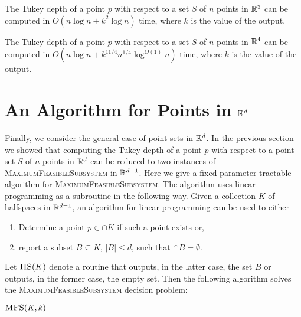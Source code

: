 \documentclass[charterfonts,lotsofwhite]{patmorin}
\begin{document}
\begin{thm}
The Tukey depth of a point $p$ with respect to a set $S$ of $n$ points
in $\mathbb{R}^3$ can be computed in $O(n\log n + k^2\log n)$ time, where
$k$ is the value of the output.
\end{thm}


\begin{thm}
The Tukey depth of a point $p$ with respect to a set $S$ of $n$ points
in $\mathbb{R}^4$ can be computed in $O(n\log n + k^{11/4}n^{1/4}\log^{O(1)}
n)$ time, where $k$ is the value of the output.
\end{thm}

\section{An Algorithm for Points in $\mathbb{R}^d$}

Finally, we consider the general case of point sets in $\mathbb{R}^d$.  
In the previous section we showed that computing the Tukey depth of
a point $p$ with respect to a point set $S$ of $n$ points in $\mathbb{R}^d$
can be reduced to two instances of \textsc{MaximumFeasibleSubsystem}
in $\mathbb{R}^{d-1}$.  Here we give a fixed-parameter tractable \cite{dfXX}
algorithm for \textsc{MaximumFeasibleSubsystem}.  The algorithm uses
linear programming as a subroutine in the following way.  Given a
collection $K$ of halfspaces in $\mathbb{R}^{d-1}$, an algorithm for linear
programming can be used to either
\begin{enumerate}
\item Determine a point $p\in\cap K$ if such a point exists or,
\item report a subset $B\subseteq K$, $|B|\le d$, such that $\cap B=\emptyset$.
\end{enumerate}
Let $\textsc{IIS}(K)$ denote a routine that outputs, in the latter
case, the set
$B$ or outputs, in the former case, the empty set.
Then the following algorithm solves the
\textsc{MaximumFeasibleSubsystem} decision problem:

\noindent$\textsc{MFS}(K,k)$
\begin{algorithmic}[1]
\ENDIF
{}
\ENDIF
{}
   \ENDIF
\ENDFOR
{}
\end{algorithmic}
\end{document}
